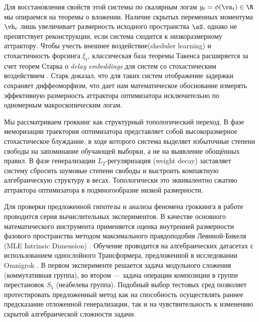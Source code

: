 \documentclass{article}
\begin{document}
Для восстановления свойств этой системы по скалярным логам $y_t = \phi(\vs_t) \in \R$ мы опираемся на теоремы о вложении. Наличие скрытых переменных моментума $\vh_t$ лишь увеличивает размерность исходного пространства $\sS$, однако не препятствует реконструкции, если система сходится к низкоразмерному аттрактору. Чтобы учесть внешнее воздействие(sheduler learning) и стохастичность форсинга $\xi_t$, классическая база теоремы Такенса \cite{takens1981detecting} расширяется за счет теорем Старка о \textit{delay embeddings} для систем со стохастическим воздействием \cite{stark1999delay, stark2003delay}. Старк доказал, что для таких систем отображение задержки сохраняет диффеоморфизм, что дает нам математическое обоснование измерять эффективную размерность аттрактора оптимизатора исключительно по одномерным макроскопическим логам.

Мы рассматриваем гроккинг как структурный топологический переход. В фазе меморизации траектория оптимизатора представляет собой высокоразмерное стохастическое блуждание, в ходе которого система выделяет избыточные степени свободы на запоминание обучающей выборки, а не на выявление обощённых правил. В фазе генерализации $L_2$-регуляризация (weight decay) заставляет систему сбросить шумовые степени свободы и выстроить компактную алгебраическую структуру в весах. Топологически это эквивалентно сжатию аттрактора оптимизатора в подмногообразие низкой размерности.


Для проверки предложенной гипотезы и анализа феномена гроккинга в работе проводится серия вычислительных экспериментов. В качестве основного математического инструмента применяется оценка внутренней размерности фазового пространства методом максимального правдоподобия Левиной-Бикеля (MLE Intrinsic Dimension) \cite{levina2004maximum}. Обучение проводится на алгебраических датасетах с использованием однослойного Трансформера, предложенной в исследовании Omnigrok \cite{liu2022omnigrok}. В первом эксперименте решается задача модульного сложения (коммутативная группа), во втором — задача операции композиции в группе перестановок $S_5$ (неабелева группа). Подобный выбор тестовых сред позволяет протестировать предложенный метод как на способность осуществлять раннее предсказание отложенной генерализации, так и на чувствительность к изменению скрытой алгебраической сложности задачи.
\end{document}

